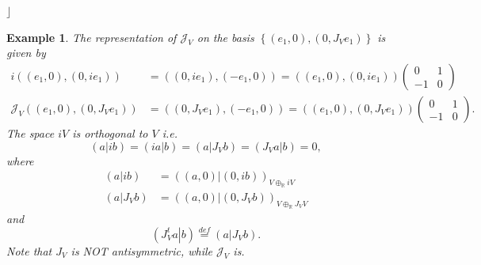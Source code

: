 \documentclass[aps,preprint]{revtex4}
\newtheorem{example}[theorem]{Example}
\begin{document}
$\rfloor$

\begin{example}
The representation of $\mathcal{J}_{V}$ on the basis $\left\{ \left(
e_{1},0\right) ,\left( 0,J_{V}e_{1}\right) \right\} $ is given by 
\begin{align}
i\left( \left( e_{1},0\right) ,\left( 0,ie_{1}\right) \right) & =\left(
\left( 0,ie_{1}\right) ,\left( -e_{1},0\right) \right) =\left( \left(
e_{1},0\right) ,\left( 0,ie_{1}\right) \right) \left( 
\begin{array}{cc}
0 & 1 \\ 
-1 & 0%
\end{array}%
\right) \\
\mathcal{J}_{V}\left( \left( e_{1},0\right) ,\left( 0,J_{V}e_{1}\right)
\right) & =\left( \left( 0,J_{V}e_{1}\right) ,\left( -e_{1},0\right) \right)
=\left( \left( e_{1},0\right) ,\left( 0,J_{V}e_{1}\right) \right) \left( 
\begin{array}{cc}
0 & 1 \\ 
-1 & 0%
\end{array}%
\right) .
\end{align}%
The space $iV$ is orthogonal to $V$ i.e. 
\begin{equation}
\left( \left. a\right\vert ib\right) =\left( \left. ia\right\vert b\right)
=\left( \left. a\right\vert J_{V}b\right) =\left( \left. J_{V}a\right\vert
b\right) =0,
\end{equation}%
where 
\begin{align}
\left( \left. a\right\vert ib\right) & =\left( \left. \left( a,0\right)
\right\vert \left( 0,ib\right) \right) _{V\oplus _{\mathbb{R}}iV} \\
\left( \left. a\right\vert J_{V}b\right) & =\left( \left. \left( a,0\right)
\right\vert \left( 0,J_{V}b\right) \right) _{V\oplus _{\mathbb{R}}J_{V}V}
\end{align}%
and 
\begin{equation}
\left( \left. J_{V}^{t}a\right\vert b\right) \overset{def}{=}\left( \left.
a\right\vert J_{V}b\right) .
\end{equation}%
\emph{Note that }$J_{V}$ \emph{is NOT antisymmetric, while }$\mathcal{J}_{V}$
\emph{is}.
\end{example}
\end{document}
